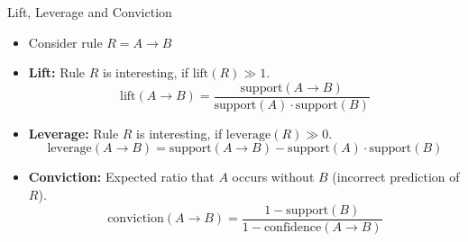 \begin{dwHeaderFrame}{Lift, Leverage and Conviction}
	\begin{itemize}
		\item Consider rule $R = A \rightarrow B$
		\item \textbf{Lift:} Rule $R$ is interesting, if $\text{lift}(R) \gg 1$.
		\begin{equation}
			\text{lift}(A \rightarrow B) = \frac{\text{support}(A \rightarrow B)}{\text{support}(A) \cdot \text{support}(B)}
		\end{equation}
		\item \textbf{Leverage:} Rule $R$ is interesting, if $\text{leverage}(R) \gg 0$.
		\begin{equation}
			\text{leverage}(A \rightarrow B) = \text{support}(A \rightarrow B) - \text{support}(A) \cdot \text{support}(B)
		\end{equation}
		\item \textbf{Conviction:} Expected ratio that $A$ occurs without $B$ (incorrect prediction of $R$).
		\begin{equation}
			\text{conviction}(A \rightarrow B) = \frac{1 - \text{support}(B)}{1 - \text{confidence}(A \rightarrow B)}
		\end{equation}
	\end{itemize}
\end{dwHeaderFrame}



